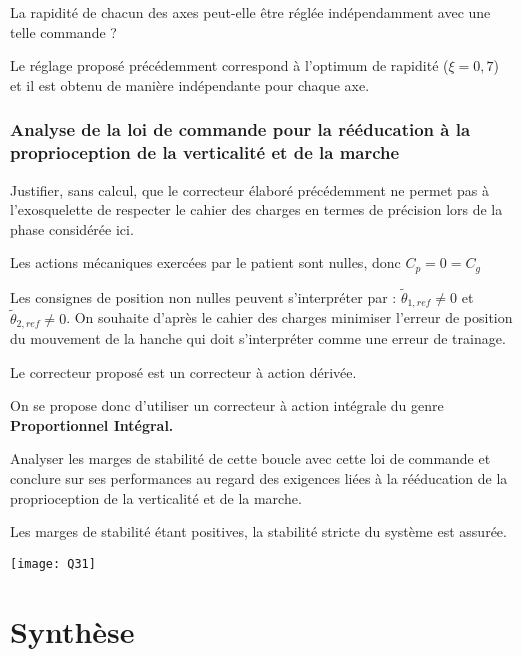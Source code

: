 \documentclass[11pt]{article}
\begin{document}
\UPSTIquestion La rapidité de chacun des axes peut-elle être réglée indépendamment avec une telle commande ?

\begin{UPSTIcorrige}
Le réglage proposé précédemment correspond à l'optimum de rapidité ($\xi=0,7$) et il est obtenu de manière indépendante pour chaque axe.

\end{UPSTIcorrige}

\subsubsection{ Analyse de la loi de commande pour la rééducation à la proprioception de la verticalité
et de la marche}
\UPSTIquestion Justifier, sans calcul, que le correcteur élaboré précédemment ne permet pas à l’exosquelette de respecter le cahier des charges en termes de précision lors de la phase considérée ici.


\begin{UPSTIcorrige}

Les actions mécaniques exercées par le patient sont nulles, donc $C_p=0=C_g$

Les consignes de position non nulles peuvent s'interpréter par : $\tilde{\theta}_{1,ref}\neq 0$ et $\tilde{\theta}_{2,ref}\neq 0$.
On souhaite d'après le cahier des charges minimiser l'erreur de position du mouvement de la hanche qui doit s'interpréter comme une erreur de trainage.

Le correcteur proposé est un correcteur à action dérivée.

On se propose donc d'utiliser un correcteur à action intégrale du genre \textbf{Proportionnel Intégral.}

\end{UPSTIcorrige}

\UPSTIquestion Analyser les marges de stabilité de cette boucle avec cette loi de commande et conclure sur ses
performances au regard des exigences liées à la rééducation de la proprioception de la verticalité et de la
marche.

\begin{UPSTIcorrige}
Les marges de stabilité étant positives, la stabilité stricte du système est assurée. 
\begin{center}
\texttt{[image: Q31]}
\end{center}
\end{UPSTIcorrige}

\section{Synthèse}
\end{document}
